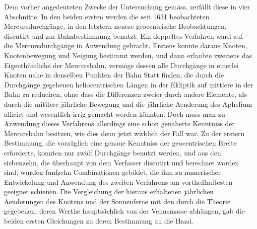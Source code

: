 Dem vorher angedeuteten Zwecke der Untersuchung gemäss, zerfällt diese in vier Abschnitte. In den beiden ersten werden die seit 1631 beobachteten Mercursdurchgänge, in den letztern neuere geocentrische Beobachtungen, discutirt und zur Bahnbestimmung benutzt. Ein doppeltes Verfahren ward auf die Mercursdurchgänge in Anwendung gebracht. Erstens konnte daraus Knoten, Knotenbewegung und Neigung bestimmt werden, und dann erlaubte zweitens das Eigenthümliche der Mercursbahn, vermöge dessen alle Durchgänge in einerlei Knoten nahe in denselben Punkten der Bahn Statt finden, die durch die Durchgänge gegebenen heliocentrischen Längen in der Ekliptik auf mittlere in der Bahn zu reduciren, ohne dass die Differenzen zweier durch andere Elemente, als durch die mittlere jährliche Bewegung und die jährliche Aenderung des Aphelium afficirt und wesentlich irrig gemacht werden könnten. Doch muss man zu Anwendung dieses Verfahrens allerdings eine schon genäherte Kenntniss der Mercursbahn besitzen, wie dies denn jetzt wirklich der Fall war. Zu der erstern Bestimmung, die vorzüglich eine genaue Kenntniss der geocentrischen Breite erforderte, konnten nur zwölf Durchgänge benutzt werden, und aus den siebenzehn, die überhaupt von dem Verfasser discutirt und berechnet worden sind, wurden funfzehn Combinationen gebildet, die ihm zu numerischer Entwickelung und Anwendung des zweiten Verfahrens am vortheilhaftesten geeignet schienen. Die Vergleichung der hieraus erhaltenen jährlichen Aenderungen des Knotens und der Sonnenferne mit den durch die Theorie gegebenen, deren Werthe hauptsächlich von der Venusmasse abhängen, gab die beiden ersten Gleichungen zu deren Bestimmung an die Hand.

